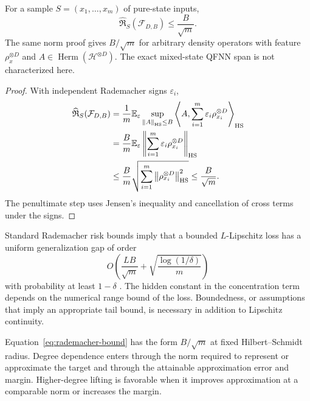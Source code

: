 \documentclass[pdflatex,sn-mathphys,NameDate,iicol]{sn-jnl}
\newcommand{\E}{\mathbb{E}}
\newcommand{\norm}[1]{\left\lVert #1\right\rVert}
\newcommand{\Herm}{\operatorname{Herm}}
\newcommand{\Rad}{\mathfrak{R}}
\newcommand{\cF}{\mathcal{F}}
\newcommand{\cH}{\mathcal{H}}
\begin{document}
\begin{theorem}
\label{thm:rademacher}
For a sample $S=(x_1,\ldots,x_m)$ of pure-state inputs,
\begin{equation}
  \widehat{\Rad}_S(\cF_{D,B})
  \le
  \frac{B}{\sqrt m}.
  \label{eq:rademacher-bound}
\end{equation}
The same norm proof gives $B/\sqrt m$ for arbitrary density operators with
feature $\rho_x^{\otimes D}$ and
$A\in\Herm(\cH^{\otimes D})$. The exact mixed-state QFNN span is not
characterized here.
\end{theorem}

\begin{proof}
With independent Rademacher signs $\varepsilon_i$,
\begin{align}
  \widehat{\Rad}_S(\cF_{D,B})
  &=
  \frac1m
  \E_\varepsilon
  \sup_{\norm A_{\rm HS}\le B}
  \left\langle
    A,\sum_{i=1}^{m}
    \varepsilon_i\rho_{x_i}^{\otimes D}
  \right\rangle_{\rm HS}\\
  &=
  \frac{B}{m}
  \E_\varepsilon
  \norm{
    \sum_{i=1}^{m}
    \varepsilon_i\rho_{x_i}^{\otimes D}
  }_{\rm HS}\\
  &\le
  \frac{B}{m}
  \sqrt{
    \sum_{i=1}^{m}
    \norm{\rho_{x_i}^{\otimes D}}_{\rm HS}^{2}
  }
  \le
  \frac{B}{\sqrt m}.
\end{align}
The penultimate step uses Jensen's inequality and cancellation of cross
terms under the signs.
\end{proof}

Standard Rademacher risk bounds imply that a bounded
$L$-Lipschitz loss has a uniform generalization gap of order
\begin{equation}
  O\!\left(
    \frac{LB}{\sqrt m}
    +
    \sqrt{\frac{\log(1/\delta)}{m}}
  \right)
  \label{eq:loss-generalization}
\end{equation}
with probability at least $1-\delta$
\citep{bartlett2002rademacher}. The hidden constant in the concentration
term depends on the numerical range bound of the loss. Boundedness, or
assumptions that imply an appropriate tail bound, is necessary in addition
to Lipschitz continuity.

\begin{remark}
Equation~\eqref{eq:rademacher-bound} has the form $B/\sqrt m$ at fixed
Hilbert--Schmidt radius. Degree dependence enters through the norm required to
represent or approximate the target and through the attainable approximation
error and margin. Higher-degree lifting is favorable when it improves
approximation at a comparable norm or increases the margin.
\end{remark}
\end{document}
